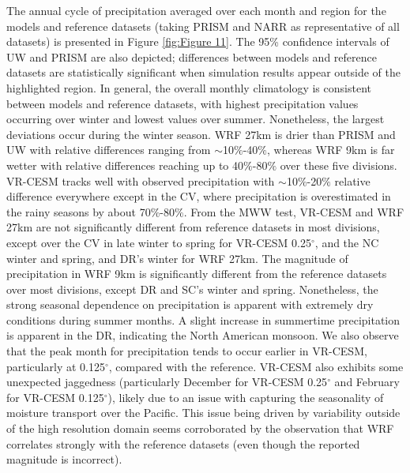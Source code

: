 The annual cycle of precipitation averaged over each month and region for the models and reference datasets (taking PRISM and NARR as representative of all datasets) is presented in Figure \ref{fig:Figure 11}. The 95\% confidence intervals of UW and PRISM are also depicted; differences between models and reference datasets are statistically significant when simulation results appear outside of the highlighted region. In general, the overall monthly climatology is consistent between models and reference datasets, with highest precipitation values occurring over winter and lowest values over summer. Nonetheless, the largest deviations occur during the winter season. WRF 27km is drier than PRISM and UW with relative differences ranging from $\sim$10$\%$-40$\%$, whereas WRF 9km is far wetter with relative differences reaching up to 40$\%$-80$\%$ over these five divisions. VR-CESM tracks well with observed precipitation with $\sim$10$\%$-20$\%$ relative difference everywhere except in the CV, where precipitation is overestimated in the rainy seasons by about 70$\%$-80$\%$. From the MWW test, VR-CESM and WRF 27km are not significantly different from reference datasets in most divisions, except over the CV in late winter to spring for VR-CESM 0.25$^\circ$, and the NC winter and spring, and DR's winter for WRF 27km. The magnitude of precipitation in WRF 9km is significantly different from the reference datasets over most divisions, except DR and SC's winter and spring. Nonetheless, the strong seasonal dependence on precipitation is apparent with extremely dry conditions during summer months. A slight increase in summertime precipitation is apparent in the DR, indicating the North American monsoon. We also observe that the peak month for precipitation tends to occur earlier in VR-CESM, particularly at 0.125$^\circ$, compared with the reference. VR-CESM also exhibits some unexpected jaggedness (particularly December for VR-CESM 0.25$^\circ$ and February for VR-CESM 0.125$^\circ$), likely due to an issue with capturing the seasonality of moisture transport over the Pacific. This issue being driven by variability outside of the high resolution domain seems corroborated by the observation that WRF correlates strongly with the reference datasets (even though the reported magnitude is incorrect).

